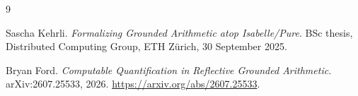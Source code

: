 \documentclass[11pt]{article}
\begin{document}









\begin{thebibliography}{9}

Sascha Kehrli.
\emph{Formalizing Grounded Arithmetic atop Isabelle/Pure}.
BSc thesis, Distributed Computing Group, ETH Z\"urich,
30 September 2025.

Bryan Ford.
\emph{Computable Quantification in Reflective Grounded Arithmetic}.
arXiv:2607.25533, 2026.
\url{https://arxiv.org/abs/2607.25533}.

\end{thebibliography}

\clearpage
\appendix

\end{document}
